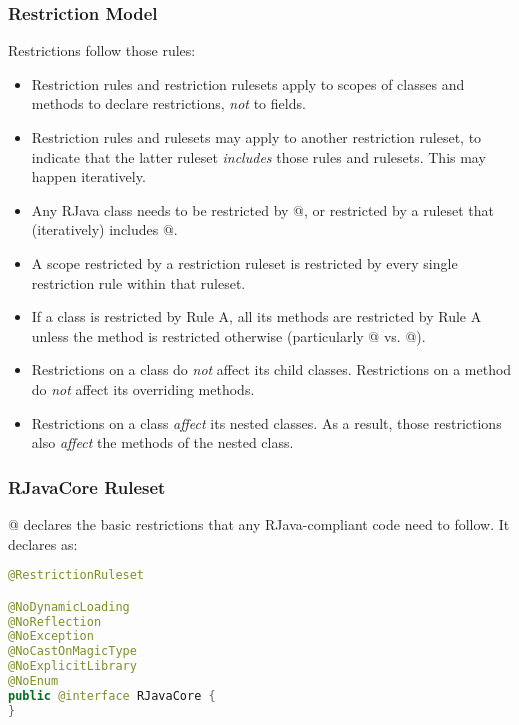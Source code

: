 \documentclass[12pt]{article}
\begin{document}
\subsubsection{Restriction Model}
Restrictions follow those rules:

\begin{itemize}

\item 
Restriction rules and restriction rulesets apply to scopes of
classes and methods to declare restrictions, \emph{not} to fields. 
\item
Restriction rules and rulesets may apply to another restriction ruleset,
to indicate that the latter ruleset \emph{includes} those rules and rulesets.
This may happen iteratively. 
\item
Any RJava class needs to be restricted by @, or restricted
by a ruleset that (iteratively) includes @.
\item
A scope restricted by a restriction ruleset is restricted by every single
restriction rule within that ruleset. 
\item
If a class is restricted by Rule A, all its methods are restricted by Rule A 
unless the method is restricted otherwise 
(particularly @ vs. @). 
\item
Restrictions on a class do \emph{not} affect its child classes. Restrictions on a method
do \emph{not} affect its overriding methods. 
\item
Restrictions on a class \emph{affect} its nested classes. As a result, 
those restrictions also \emph{affect} the methods of the nested class. 

\end{itemize}

\subsubsection{RJavaCore Ruleset}

@ declares the basic restrictions that any RJava-compliant code
need to follow. It declares as:

\begin{lstlisting}[language=java]
@RestrictionRuleset

@NoDynamicLoading
@NoReflection
@NoException
@NoCastOnMagicType
@NoExplicitLibrary
@NoEnum
public @interface RJavaCore {
}
\end{lstlisting}
\end{document}

